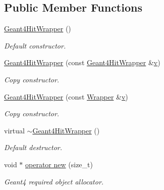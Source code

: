 \subsection*{Public Member Functions}
\begin{DoxyCompactItemize}
\item 
\hyperlink{class_d_d4hep_1_1_simulation_1_1_geant4_hit_wrapper_a57ccfb5f6f606751279a9c3222532250}{Geant4HitWrapper} ()
\begin{DoxyCompactList}\small\item\em Default constructor. \item\end{DoxyCompactList}\item 
\hyperlink{class_d_d4hep_1_1_simulation_1_1_geant4_hit_wrapper_a067b6f5a7e88d4f85d6554b563047916}{Geant4HitWrapper} (const \hyperlink{class_d_d4hep_1_1_simulation_1_1_geant4_hit_wrapper}{Geant4HitWrapper} \&\hyperlink{_multi_view_8cpp_a8320ee13ac034dbf6d624fe8953dd337}{v})
\begin{DoxyCompactList}\small\item\em Copy constructor. \item\end{DoxyCompactList}\item 
\hyperlink{class_d_d4hep_1_1_simulation_1_1_geant4_hit_wrapper_a4582891698f74e839dadd7cb78ae00e4}{Geant4HitWrapper} (const \hyperlink{class_d_d4hep_1_1_simulation_1_1_geant4_hit_wrapper_a4779e35eba7d553e0f2d497c49a42ec6}{Wrapper} \&\hyperlink{_multi_view_8cpp_a8320ee13ac034dbf6d624fe8953dd337}{v})
\begin{DoxyCompactList}\small\item\em Copy constructor. \item\end{DoxyCompactList}\item 
virtual \hyperlink{class_d_d4hep_1_1_simulation_1_1_geant4_hit_wrapper_ae5a3a00858bb69ec71673f7286be2bab}{$\sim$Geant4HitWrapper} ()
\begin{DoxyCompactList}\small\item\em Default destructor. \item\end{DoxyCompactList}\item 
void $\ast$ \hyperlink{class_d_d4hep_1_1_simulation_1_1_geant4_hit_wrapper_a645e452e2bb8c642286e323e514f0fef}{operator new} (size\_\-t)
\begin{DoxyCompactList}\small\item\em Geant4 required object allocator. \item\end{DoxyCompactList}\item 

\end{DoxyCompactItemize}
